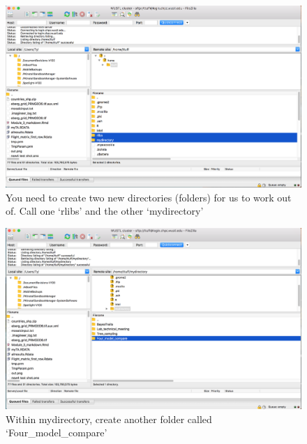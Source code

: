 \documentclass[]{book}
\theoremstyle{definition}
\theoremstyle{definition}
\theoremstyle{definition}
\theoremstyle{remark}
\begin{document}
\begin{figure}
\centering
\includegraphics{Create two files within your home file.png}
\caption{You need to create two new directories (folders) for us to work
out of. Call one `rlibs' and the other `mydirectory'}
\end{figure}

\begin{figure}
\centering
\includegraphics{Create Four_models_compare folder.png}
\caption{Within mydirectory, create another folder called
`Four\_model\_compare'}
\end{figure}
\end{document}

